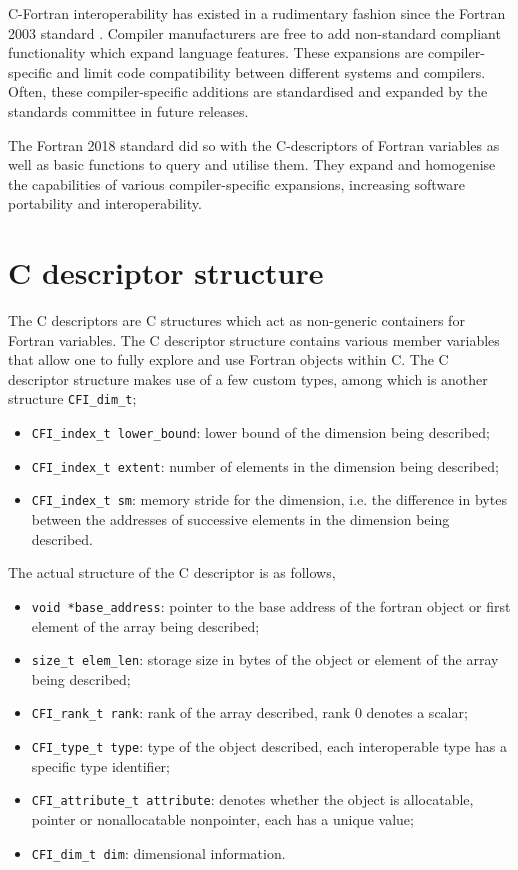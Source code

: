 C-Fortran interoperability has existed in a rudimentary fashion since the Fortran 2003 standard \cite{fortran}. Compiler manufacturers are free to add non-standard compliant functionality which expand language features. These expansions are compiler-specific and limit code compatibility between different systems and compilers. Often, these compiler-specific additions are standardised and expanded by the standards committee in future releases.

The Fortran 2018 standard did so with the C-descriptors of Fortran variables as well as basic functions to query and utilise them. They expand and homogenise the capabilities of various compiler-specific expansions, increasing software portability and interoperability.

\section{C descriptor structure}

The C descriptors are C structures which act as non-generic containers for Fortran variables. The C descriptor structure contains various member variables that allow one to fully explore and use Fortran objects within C. The C descriptor structure makes use of a few custom types, among which is another structure \texttt{CFI\_dim\_t};
\begin{itemize}
    \item \texttt{CFI\_index\_t lower\_bound}: lower bound of the dimension being described;
    \item \texttt{CFI\_index\_t extent}: number of elements in the dimension being described;
    \item \texttt{CFI\_index\_t sm}: memory stride for the dimension, i.e. the difference in bytes between the addresses of successive elements in the dimension being described.
\end{itemize}
The actual structure of the C descriptor is as follows,
\begin{itemize}
    \item \texttt{void *base\_address}: pointer to the base address of the fortran object or first element of the array being described;
    \item \texttt{size\_t elem\_len}: storage size in bytes of the object or element of the array being described;
    \item \texttt{CFI\_rank\_t rank}: rank of the array described, rank 0 denotes a scalar;
    \item \texttt{CFI\_type\_t type}:  type of the object described, each interoperable type has a specific type identifier;
    \item \texttt{CFI\_attribute\_t attribute}: denotes whether the object is allocatable, pointer or nonallocatable nonpointer, each has a unique value;
    \item \texttt{CFI\_dim\_t dim}: dimensional information.
\end{itemize}

